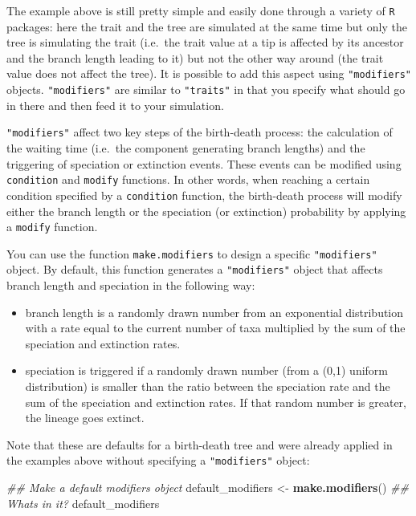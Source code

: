 \documentclass[
]{book}
\newenvironment{Shaded}{\begin{snugshade}}{\end{snugshade}}
\newcommand{\CommentTok}[1]{\textcolor[rgb]{0.56,0.35,0.01}{\textit{#1}}}
\newcommand{\KeywordTok}[1]{\textcolor[rgb]{0.13,0.29,0.53}{\textbf{#1}}}
\newcommand{\NormalTok}[1]{#1}
\newcommand{\StringTok}[1]{\textcolor[rgb]{0.31,0.60,0.02}{#1}}
\providecommand{\tightlist}{%
  \setlength{\itemsep}{0pt}\setlength{\parskip}{0pt}}
\begin{document}
The example above is still pretty simple and easily done through a variety of \texttt{R} packages: here the trait and the tree are simulated at the same time but only the tree is simulating the trait (i.e.~the trait value at a tip is affected by its ancestor and the branch length leading to it) but not the other way around (the trait value does not affect the tree).
It is possible to add this aspect using \texttt{"modifiers"} objects.
\texttt{"modifiers"} are similar to \texttt{"traits"} in that you specify what should go in there and then feed it to your simulation.

\texttt{"modifiers"} affect two key steps of the birth-death process: the calculation of the waiting time (i.e.~the component generating branch lengths) and the triggering of speciation or extinction events.
These events can be modified using \texttt{condition} and \texttt{modify} functions.
In other words, when reaching a certain condition specified by a \texttt{condition} function, the birth-death process will modify either the branch length or the speciation (or extinction) probability by applying a \texttt{modify} function.

You can use the function \texttt{make.modifiers} to design a specific \texttt{"modifiers"} object.
By default, this function generates a \texttt{"modifiers"} object that affects branch length and speciation in the following way:

\begin{itemize}
\tightlist
\item
  branch length is a randomly drawn number from an exponential distribution with a rate equal to the current number of taxa multiplied by the sum of the speciation and extinction rates.
\item
  speciation is triggered if a randomly drawn number (from a (0,1) uniform distribution) is smaller than the ratio between the speciation rate and the sum of the speciation and extinction rates. If that random number is greater, the lineage goes extinct.
\end{itemize}

Note that these are defaults for a birth-death tree and were already applied in the examples above without specifying a \texttt{"modifiers"} object:

\begin{Shaded}
\begin{Highlighting}[]
\CommentTok{\#\# Make a default modifiers object}
\NormalTok{default\_modifiers \textless{}{-}}\StringTok{ }\KeywordTok{make.modifiers}\NormalTok{()}
\CommentTok{\#\# What\textquotesingle{}s in it?}
\NormalTok{default\_modifiers}
\end{Highlighting}
\end{Shaded}
\end{document}
